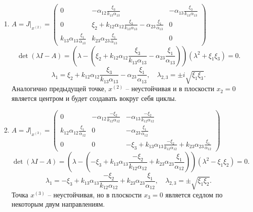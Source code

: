 \begin{enumerate}
        \item \(
            A = J \big|_{x^{(2)}} = \left(\begin{matrix}
                0 & -\alpha_{12} \frac{\xi_3}{k_{13} \alpha_{13}} & -\alpha_{13} \frac{\xi_3}{k_{13} \alpha_{13}} \\[10pt]
                0 & \xi_2 + k_{12} \alpha_{12} \frac{\xi_3}{k_{13} \alpha_{13}} - \alpha_{23}  \frac{\xi_1}{\alpha_{13}} & 0 \\[10pt]
                k_{13} \alpha_{13} \frac{\xi_1}{\alpha_{13}} & k_{23} \alpha_{23} \frac{\xi_1}{\alpha_{13}}  & 0
            \end{matrix}\right)
        \)
        \[
            \det(\lambda I - A) = \left(\lambda - \left(\xi_2 + k_{12} \alpha_{12} \frac{\xi_3}{k_{13} \alpha_{13}} - \alpha_{23}  \frac{\xi_1}{\alpha_{13}} \right) \right)(\lambda^2 + \xi_1 \xi_3) = 0.
        \]
        \[
            \lambda_1 = \xi_2 + k_{12} \alpha_{12} \frac{\xi_3}{k_{13} \alpha_{13}} - \alpha_{23}  \frac{\xi_1}{\alpha_{13}}, \quad \lambda_{2,3} = \pm i \sqrt{\xi_1 \xi_3}.
        \]
        Аналогично предыдущей точке, \( x^{(2)} \) -- неустойчивая и в плоскости \( x_2 = 0 \) является центром и будет создавать вокруг себя циклы.

        \item \(
            A = J \big|_{x^{(3)}} = \left(\begin{matrix}
                0 & -\alpha_{12} \frac{-\xi_2}{k_{12} \alpha_{12}} & -\alpha_{13} \frac{-\xi_2}{k_{12} \alpha_{12}} \\[10pt]
                k_{12} \alpha_{12} \frac{\xi_1}{\alpha_{12}} & 0 & -\alpha_{23} \frac{\xi_1}{\alpha_{12}} \\[10pt]
                0 & 0 & -\xi_3 + k_{13} \alpha_{13} \frac{-\xi_2}{k_{12} \alpha_{12}} + k_{23} \alpha_{23} \frac{\xi_1}{\alpha_{12}}
            \end{matrix}\right)
        \)
        \[
            \det(\lambda I - A) = \left(\lambda - \left(-\xi_3 + k_{13} \alpha_{13} \frac{-\xi_2}{k_{12} \alpha_{12}} + k_{23} \alpha_{23} \frac{\xi_1}{\alpha_{12}} \right) \right)(\lambda^2 - \xi_1 \xi_2) = 0.
        \]
        \[
            \lambda_1 = -\xi_3 + k_{13} \alpha_{13} \frac{-\xi_2}{k_{12} \alpha_{12}} + k_{23} \alpha_{23} \frac{\xi_1}{\alpha_{12}}, \quad \lambda_{2,3} = \pm \sqrt{\xi_1 \xi_2}.
        \]
        Точка \( x^{(3)} \) -- неустойчивая, но в плоскости \( x_3 = 0 \) является седлом по некоторым двум направлениям.


\end{enumerate}
